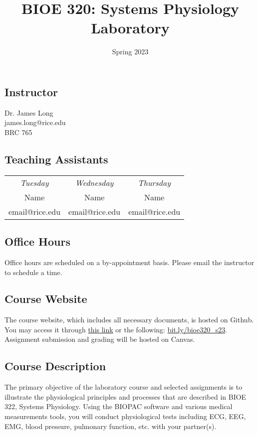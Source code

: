 \documentclass{article}
\title{BIOE 320: Systems Physiology Laboratory}
\author{Spring 2023}
\date{}
\begin{document}
\maketitle
\subsection*{Instructor}
Dr. James Long\\
james.long@rice.edu\\
BRC 765

\subsection*{Teaching Assistants}
\begin{table}[h!]
	\centering
\begin{tabular}[h!]{ccc}
\textit{Tuesday} & \textit{Wednesday} & \textit{Thursday}\\
Name & Name & Name\\
email@rice.edu & email@rice.edu & email@rice.edu
\end{tabular}
\end{table}

\subsection*{Office Hours}
Office hours are scheduled on a by-appointment basis. Please email the instructor to schedule a time.

\subsection*{Course Website}
The course website, which includes all necessary documents, is hosted on Github. You may access it through \href{https://jameslong12.github.io/BIOE320}{this link} or the following: \href{https://bit.ly/bioe320_s23}{bit.ly/bioe320\_s23}. Assignment submission and grading will be hosted on Canvas.

\subsection*{Course Description}
The primary objective of the laboratory course and selected assignments is to illustrate the physiological principles and processes that are described in BIOE 322, Systems Physiology. Using the BIOPAC software and various medical measurements tools, you will conduct physiological tests including ECG, EEG, EMG, blood pressure, pulmonary function, etc. with your partner(s).
\end{document}
